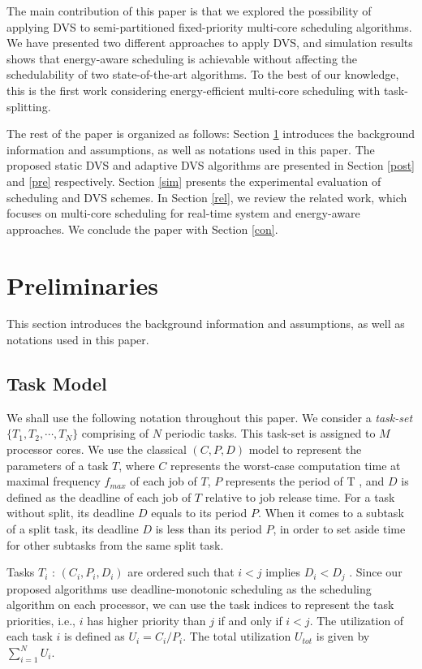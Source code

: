\documentclass[12pt, journal,compsoc]{IEEEtran}
\begin{document}
The main contribution of this paper is that we explored the possibility of applying DVS to semi-partitioned fixed-priority multi-core scheduling algorithms. We have presented two different approaches to apply DVS, and simulation results shows that energy-aware scheduling is achievable without affecting the schedulability of two state-of-the-art algorithms. To the best of our knowledge, this is the first work considering energy-efficient multi-core scheduling with task-splitting.

The rest of the paper is organized as follows: Section \ref{prelim} introduces the background information and assumptions, as well as notations used in this paper. The proposed static DVS and adaptive DVS algorithms are presented in Section \ref{post} and \ref{pre} respectively. Section \ref{sim} presents the experimental evaluation of scheduling and DVS schemes. In Section \ref{rel}, we review the related work, which focuses on multi-core scheduling for real-time system and energy-aware approaches. We conclude the paper with Section \ref{con}.





\section{Preliminaries}
\label{prelim}

This section introduces the background information and assumptions, as well as notations used in this paper.

\subsection{Task Model}

We shall use the following notation throughout this paper. We consider a \emph{task-set} $\{T_1, T_2, \cdots, T_N\}$ comprising of $N$ periodic tasks. This task-set is assigned to $M$ processor cores. We use the classical $(C,P,D)$ model to represent the parameters of a task $T$, where $C$ represents the worst-case computation time at maximal frequency $f_{max}$ of each job of $T$, $P$ represents the period of T , and $D$ is defined as the deadline of each job of $T$ relative to job release time. For a task without split, its deadline $D$ equals to its period $P$. When it comes to a subtask of a split task, its deadline $D$ is less than its period $P$, in order to set aside time for other subtasks from the same split task.

Tasks $T_i$ : $(C_i,P_i,D_i)$ are ordered such that $i < j$ implies $D_i < D_j$ . Since our proposed algorithms use deadline-monotonic scheduling as the scheduling algorithm on each processor, we can use the task indices to represent the task priorities, i.e., $i$ has higher priority than $j$ if and only if $i < j$. The utilization of each task $i$ is defined as $U_i = C_i / P_i$. The total utilization $U_{tot}$ is given by $\sum\limits_{i=1}^N U_i$.
\end{document}

